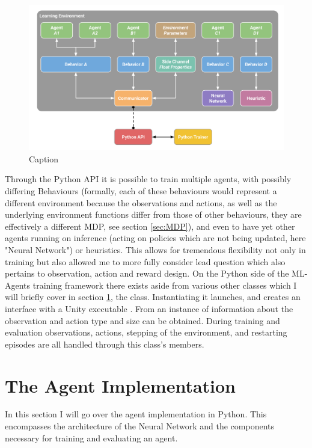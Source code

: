 \begin{figure}[H]
    \centering
    \includegraphics[width=0.75\linewidth]{figures/ml_agents_python_communicator.png}
    \caption{Caption}
    \label{fig:python_communicator}
\end{figure}

\noindent
Through the Python API it is possible to train multiple agents, with possibly differing Behaviours (formally, each of these behaviours would represent a different environment because the observations and actions, as well as the underlying environment functions differ from those of other behaviours, they are effectively a different MDP, see section \ref{sec:MDP}), and even to have yet other agents running on inference (acting on policies which are not being updated, here "Neural Network") or heuristics. This allows for tremendous flexibility not only in training but also allowed me to more fully consider lead question which also pertains to observation, action and reward design. On the Python side of the ML-Agents training framework there exists aside from various other classes which I will briefly cover in section \ref{sec:ip:agent_implementation}, the  class. Instantiating it launches, and creates an interface with a Unity executable \cite[p. 13]{juliani2020unity}. From an instance of  information about the observation and action type and size can be obtained. During training and evaluation observations, actions, stepping of the environment, and restarting episodes are all handled through this class's members.

\section{The Agent Implementation}\label{sec:ip:agent_implementation}
In this section I will go over the agent implementation in Python. This encompasses the architecture of the Neural Network and the components necessary for training and evaluating an agent.

